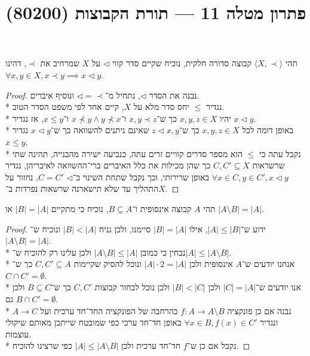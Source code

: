 
\title{פתרון מטלה 11 --- תורת הקבוצות (80200)}


\maketitle
\maketitleprint{}

\Question{}
תהי $\langle X, \prec \rangle$ קבוצה סדורה חלקית, נוכיח שקיים סדר קווי $\triangleleft$ על $X$ שמרחיב את $\prec$,
דהינו $\forall x, y \in X, x \prec y \implies x \triangleleft y$.
\begin{proof}
	נבנה את הסדר $\triangleleft$, נתחיל מ־$\triangleleft = \prec$ ונוסיף איברים. \\*
	נגדיר $\le$ יחס סדר מלא על $X$, קיים אחד לפי משפט הסדר הטוב. \\*
	יהיו $x, y, z \in X$ כך ש־$x, y \prec z$ ו־$x \not\prec y \land y \not\prec x$ ו־$x \le y$, אז נגדיר $x \triangleleft y$. \\*
	באופן דומה לכל $x, y, z \in X$ כך ש־$z \triangleleft x, y$ שאינם ניתנים להשוואה כך ש־$x \triangleleft y$ נגדיר $x \le y$. \\*
	נקבל עתה כי $\le$ הוא מספר סדרים קוויים זרים עתה, כנביעה ישירה מהבנייה, תהינה שתי שרשראות $C, C' \subseteq X$ כך שהן מכילות את כלל האיברים ברי־ההשוואה לאיבריהן,
	נגדיר $\forall x \in C, y \in C', x \triangleleft y$ באופן שרירותי, וכך נקבל שתחת השינוי ב־$\triangleleft$ $C = C'$, נחזור על התהליך עד שלא תישארנה שרשאות נפרדות ב־$X$.
\end{proof}

\Question{}
תהי $A$ קבוצה אינסופית ו־$B \subseteq A$, נוכיח כי מתקיים $|B| = |A|$ או $|A \setminus B| = |A|$.
\begin{proof}
	ידוע ש־$|A| \le |B|$, אילו $|B| = |A|$ סיימנו, ולכן נניח $|B| < |A|$ ונוכיח ש־$|A \setminus B| = |A|$. \\*
	נבחין כי כמובן $|A \setminus B| \le |A|$ ולכן עלינו רק להוכיח ש־$|A| \le |A \setminus B|$. \\*
	אנחנו יודעים ש־$A$ אינסופית ולכן $|A| \cdot 2 = |A|$ ונוכל להסיק שקיימות $C, C' \subseteq A$ כך ש־$C \cap C' = \emptyset$. \\*
	אנו יודעים ש־$|C| = |A|$ ולכן $|B| < |C|$ ולכן נוכל לבחור קבוצות $C, C'$ כך ש־$B \subseteq C$ ולכן גם $B \cap C' = \emptyset$. \\*
	נבנה אם כן פונקציה $f : A \to A \setminus B$ כהרחבה של הפונקציה החד־חד ערכית ועל $A \to C$ ונגדיר $\forall x \in B, f(x) \in C'$ באופן חד־חד ערכי כפי שמובטח שייתכן מאותם שיקולי עוצמות. \\*
	נקבל אם כן ש־$f$ חד־חד ערכית ולכן $|A| \le |A \setminus B|$ כפי שרצינו להוכיח.
\end{proof}

